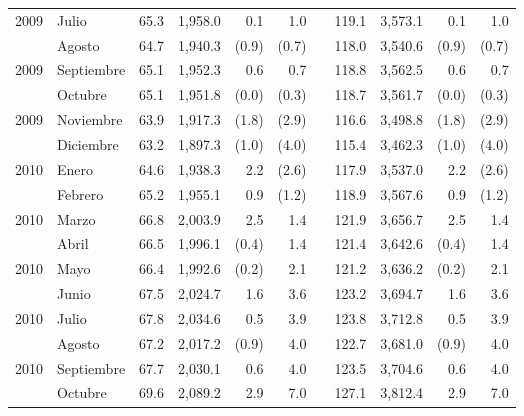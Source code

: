 \begin{center}
\begin{longtable}{llrrrrrrrrr}
		\multicolumn{1}{l}{	2009	}&	Julio	&	 65.3 	&	 1,958.0 	&	 0.1 	&	 1.0 	&  &	 119.1 	&	 3,573.1 	&	 0.1 	&	 1.0 	\\
		\rowcolor{color1!5!white}\multicolumn{1}{l}{	2009	}&	Agosto	&	 64.7 	&	 1,940.3 	&	 (0.9)	&	 (0.7)	&  &	 118.0 	&	 3,540.6 	&	 (0.9)	&	 (0.7)	\\
		\multicolumn{1}{l}{	2009	}&	Septiembre	&	 65.1 	&	 1,952.3 	&	 0.6 	&	 0.7 	&  &	 118.8 	&	 3,562.5 	&	 0.6 	&	 0.7 	\\
		\rowcolor{color1!5!white}\multicolumn{1}{l}{	2009	}&	Octubre	&	 65.1 	&	 1,951.8 	&	 (0.0)	&	 (0.3)	&  &	 118.7 	&	 3,561.7 	&	 (0.0)	&	 (0.3)	\\
		\multicolumn{1}{l}{	2009	}&	Noviembre	&	 63.9 	&	 1,917.3 	&	 (1.8)	&	 (2.9)	&  &	 116.6 	&	 3,498.8 	&	 (1.8)	&	 (2.9)	\\
		\rowcolor{color1!5!white}\multicolumn{1}{l}{	2009	}&	Diciembre	&	 63.2 	&	 1,897.3 	&	 (1.0)	&	 (4.0)	&  &	 115.4 	&	 3,462.3 	&	 (1.0)	&	 (4.0)	\\
		\multicolumn{1}{l}{	2010	}&	Enero	&	 64.6 	&	 1,938.3 	&	 2.2 	&	 (2.6)	&  &	 117.9 	&	 3,537.0 	&	 2.2 	&	 (2.6)	\\
		\rowcolor{color1!5!white}\multicolumn{1}{l}{	2010	}&	Febrero	&	 65.2 	&	 1,955.1 	&	 0.9 	&	 (1.2)	&  &	 118.9 	&	 3,567.6 	&	 0.9 	&	 (1.2)	\\
		\multicolumn{1}{l}{	2010	}&	Marzo	&	 66.8 	&	 2,003.9 	&	 2.5 	&	 1.4 	&  &	 121.9 	&	 3,656.7 	&	 2.5 	&	 1.4 	\\
		\rowcolor{color1!5!white}\multicolumn{1}{l}{	2010	}&	Abril	&	 66.5 	&	 1,996.1 	&	 (0.4)	&	 1.4 	&  &	 121.4 	&	 3,642.6 	&	 (0.4)	&	 1.4 	\\
		\multicolumn{1}{l}{	2010	}&	Mayo	&	 66.4 	&	 1,992.6 	&	 (0.2)	&	 2.1 	&  &	 121.2 	&	 3,636.2 	&	 (0.2)	&	 2.1 	\\
		\rowcolor{color1!5!white}\multicolumn{1}{l}{	2010	}&	Junio	&	 67.5 	&	 2,024.7 	&	 1.6 	&	 3.6 	&  &	 123.2 	&	 3,694.7 	&	 1.6 	&	 3.6 	\\
		\multicolumn{1}{l}{	2010	}&	Julio	&	 67.8 	&	 2,034.6 	&	 0.5 	&	 3.9 	&  &	 123.8 	&	 3,712.8 	&	 0.5 	&	 3.9 	\\
		\rowcolor{color1!5!white}\multicolumn{1}{l}{	2010	}&	Agosto	&	 67.2 	&	 2,017.2 	&	 (0.9)	&	 4.0 	&  &	 122.7 	&	 3,681.0 	&	 (0.9)	&	 4.0 	\\
		\multicolumn{1}{l}{	2010	}&	Septiembre	&	 67.7 	&	 2,030.1 	&	 0.6 	&	 4.0 	&  &	 123.5 	&	 3,704.6 	&	 0.6 	&	 4.0 	\\
		\rowcolor{color1!5!white}\multicolumn{1}{l}{	2010	}&	Octubre	&	 69.6 	&	 2,089.2 	&	 2.9 	&	 7.0 	&  &	 127.1 	&	 3,812.4 	&	 2.9 	&	 7.0 	\\

\end{longtable}
\end{center}
